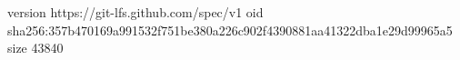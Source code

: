 version https://git-lfs.github.com/spec/v1
oid sha256:357b470169a991532f751be380a226c902f4390881aa41322dba1e29d99965a5
size 43840
